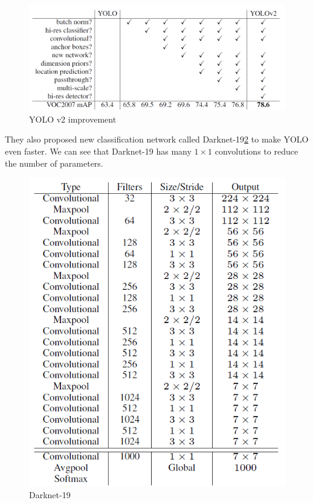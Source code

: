 \documentclass[twoside]{ctuthesis}
\theoremstyle{plain}
\theoremstyle{definition}
\theoremstyle{note}
\begin{document}
\begin{figure}[h]
\caption{YOLO v2 improvement}
\label{yolov2_improve}
\includegraphics[width=\textwidth]{images/used_networks/yolov2_improve.png}
\end{figure}

They also proposed new classification network called Darknet-19\ref{darknet-19} to make YOLO even faster. We can see that Darknet-19 has many $1\times 1$ convolutions  to reduce the number of parameters. 

\begin{figure}[h]
\caption{Darknet-19}
\label{darknet-19}
\includegraphics[width=\textwidth]{images/used_networks/yolov2_darknet.png}
\end{figure}
\end{document}
